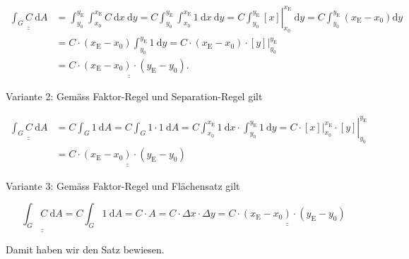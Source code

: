 \documentclass[10pt]{article}
\begin{document}
\begin{align*}
\underline{\underline{\int_{G} C \mathrm{~d} A}} & =\int_{y_{0}}^{y_{\mathrm{E}}} \int_{x_{0}}^{x_{\mathrm{E}}} C \mathrm{~d} x \mathrm{~d} y=C \int_{y_{0}}^{y_{\mathrm{E}}} \int_{x_{0}}^{x_{\mathrm{E}}} 1 \mathrm{~d} x \mathrm{~d} y=\left.C \int_{y_{0}}^{y_{\mathrm{E}}}[x]\right|_{x_{0}} ^{x_{\mathrm{E}}} \mathrm{~d} y=C \int_{y_{0}}^{y_{\mathrm{E}}}\left(x_{\mathrm{E}}-x_{0}\right) \mathrm{d} y \\
& =C \cdot\left(x_{\mathrm{E}}-x_{0}\right) \int_{y_{0}}^{y_{\mathrm{E}}} 1 \mathrm{~d} y=\left.C \cdot\left(x_{\mathrm{E}}-x_{0}\right) \cdot[y]\right|_{y_{0}} ^{y_{\mathrm{E}}} \\
& =\underline{\underline{C \cdot\left(x_{\mathrm{E}}-x_{0}\right) \cdot\left(y_{\mathrm{E}}-y_{0}\right) .}} \tag{2.84}
\end{align*}


Variante 2: Gemäss Faktor-Regel und Separation-Regel gilt


\begin{align*}
\underline{\underline{\int_{G} C \mathrm{~d} A}} & =C \int_{G} 1 \mathrm{~d} A=C \int_{G} 1 \cdot 1 \mathrm{~d} A=C \int_{x_{0}}^{x_{\mathrm{E}}} 1 \mathrm{~d} x \cdot \int_{y_{0}}^{y_{\mathrm{E}}} 1 \mathrm{~d} y=\left.\left.C \cdot[x]\right|_{x_{0}} ^{x_{\mathrm{E}}} \cdot[y]\right|_{y_{0}} ^{y_{\mathrm{E}}} \\
& =\underline{\underline{C \cdot\left(x_{\mathrm{E}}-x_{0}\right) \cdot\left(y_{\mathrm{E}}-y_{0}\right)}} \tag{2.85}
\end{align*}


Variante 3: Gemäss Faktor-Regel und Flächensatz gilt


\begin{equation*}
\underline{\underline{\int_{G} C \mathrm{~d} A}}=C \int_{G} 1 \mathrm{~d} A=C \cdot A=C \cdot \Delta x \cdot \Delta y=\underline{\underline{C \cdot\left(x_{\mathrm{E}}-x_{0}\right) \cdot\left(y_{\mathrm{E}}-y_{0}\right)}} \tag{2.86}
\end{equation*}


Damit haben wir den Satz bewiesen.
\end{document}
